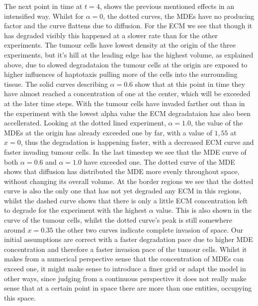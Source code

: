 The next point in time at $t=4$, shows the previous mentioned effects in an intensified way. Whilst for $\alpha=0$, the dotted curves, the MDEs have no producing factor and the curve flattens due to diffusion. For the ECM we see that though it has degraded visibly this happened at a slower rate than for the other experiments. The tumour cells have lowest density at the origin of the three experiments, but it's hill at the leading edge has the highest volume, as explained above, due to slowed degradataion the tumour cells at the origin are exposed to higher influences of haptotaxis pulling more of the cells into the surrounding tissue. 
The solid curves describing $\alpha = 0.6$ show that at this point in time they have almost reached a concentration of one at the center, which will be exceeded at the later time steps. With the tumour cells have invaded farther out than in the experiment with the lowest alpha value the ECM degradataion has also been accellerated.
Looking at the dotted lined experiment, $\alpha=1.0$, the value of the MDEs at the origin has already exceeded one by far, with a value of $1,55$ at $x=0$, thus the degradation is happening faster, with a decreased ECM curve and faster invading tumour cells.\newline 
In the last timestep we see that the MDE curve of both $\alpha=0.6$ and $\alpha=1.0$ have exceeded one. The dotted curve of the MDE shows that diffusion has distributed the MDE more evenly throughout space, without changing its overall volume. At the border regions we see that the dotted curve is also the only one that has not yet degraded any ECM in this regions, whilst the dashed curve shows that there is only a little ECM concentration left to degrade for the experiment with the highest $\alpha$ value. This is also shown in the curve of the tumour cells, whilst the dotted curve's peak is still somewhere around $x=0.35$ the other two curves indicate complete invasion of space. \newline
Our initial assumptions are correct with a faster degradation pace due to higher MDE concentration and therefore a faster invasion pace of the tumour cells. Whilst it makes from a numerical perspective sense that the concentration of MDEs can exceed one, it might make sense to introduce a finer grid or adapt the model in other ways, since judging from a continuous perspective it does not really make sense that at a certain point in space there are more than one entities, occupying this space. 

